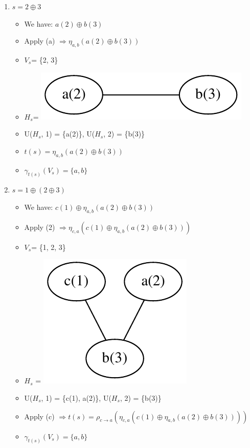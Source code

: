 \documentclass[a4paper, 12pt]{article}
\begin{document}
\begin{enumerate}
\item $s=2\oplus3$
\begin{itemize}
\item We have: $a(2)\oplus b(3)$
\item Apply (a) $\Longrightarrow\eta_{a,b}(a(2)\oplus b(3))$
\item {$V_s$}= \{2, 3\} 
\item {$H_s$}= \includegraphics[scale=0.5]{image/example3}
\item U({$H_s$}, 1) = \{a(2)\}, U({$H_s$}, 2) =
\{b(3)\} 
\item $t(s)=\eta_{a,b}(a(2)\oplus b(3))$ 
\item $\gamma_{t(s)}(V_{s})=\{a,b\}$ 
\end{itemize}

\item $s=1\oplus(2\oplus3)$
\begin{itemize}
\item We have: $c(1)\oplus\eta_{a,b}(a(2)\oplus b(3))$
\item Apply (2) $\Longrightarrow\eta_{c,a}(c(1)\oplus\eta_{a,b}(a(2)\oplus b(3)))$
\item {$V_s$}= \{1, 2, 3\} 
\item {$H_s$} = \includegraphics[scale=0.5]{image/example4}
\item U({$H_s$}, 1) = \{c(1), a(2)\}, U({$H_s$},
2) = \{b(3)\} 
\item Apply (c) $\Longrightarrow t(s)=\rho_{c\rightarrow a}(\eta_{c,a}(c(1)\oplus\eta_{a,b}(a(2)\oplus b(3))))$ 
\item $\gamma_{t(s)}(V_{s})=\{a,b\}$ 
\end{itemize}


\end{enumerate}
\end{document}
